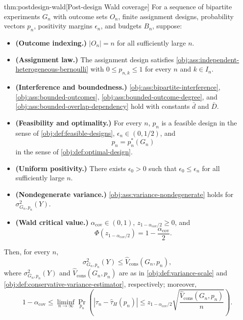 \begin{theoremv}{thm:postdesign-wald}[Post-design Wald coverage]
For a sequence of bipartite experiments $G_n$ with outcome sets $O_n$, finite assignment designs, probability vectors $p_n$, positivity margins $\epsilon_n$, and budgets $B_n$, suppose:
\begin{itemize}
\item \textbf{(Outcome indexing.)} $|O_n|=n$ for all sufficiently large $n$.
\item \textbf{(Assignment law.)} The assignment design satisfies \cref{obj:ass:independent-heterogeneous-bernoulli} with $0\le p_{n,k}\le 1$ for every $n$ and $k\in I_n$.
\item \textbf{(Interference and boundedness.)} \cref{obj:ass:bipartite-interference}, \cref{obj:ass:bounded-outcomes}, \cref{obj:ass:bounded-outcome-degree}, and \cref{obj:ass:bounded-overlap-dependency} hold with constants $\bar d$ and $\bar D$.
\item \textbf{(Feasibility and optimality.)} For every $n$, $p_n$ is a feasible design in the sense of \cref{obj:def:feasible-designs}, $\epsilon_n\in(0,1/2)$, and
\[
p_n=p_n^*(G_n)
\]
in the sense of \cref{obj:def:optimal-design}.
\item \textbf{(Uniform positivity.)} There exists $\epsilon_0>0$ such that $\epsilon_0\le\epsilon_n$ for all sufficiently large $n$.
\item \textbf{(Nondegenerate variance.)} \cref{obj:ass:variance-nondegenerate} holds for $\sigma^2_{G_n,p_n}(Y)$.
\item \textbf{(Wald critical value.)} $\alpha_{\mathrm{cov}}\in(0,1)$, $z_{1-\alpha_{\mathrm{cov}}/2}\ge0$, and
\[
\Phi\!\left(z_{1-\alpha_{\mathrm{cov}}/2}\right)
=1-\frac{\alpha_{\mathrm{cov}}}{2}.
\]
\end{itemize}
Then, for every $n$,
\[
\sigma^2_{G_n,p_n}(Y)\le \widehat V_{\mathrm{cons}}(G_n,p_n),
\]
where $\sigma^2_{G_n,p_n}(Y)$ and $\widehat V_{\mathrm{cons}}(G_n,p_n)$ are as in \cref{obj:def:variance-scale} and \cref{obj:def:conservative-variance-estimator}, respectively; moreover,
\[
1-\alpha_{\mathrm{cov}}
\le
\liminf_{n\to\infty}
\Pr_{p_n}\!\left(
\left|\tau_n-\widehat\tau_H(p_n)\right|
\le
z_{1-\alpha_{\mathrm{cov}}/2}
\sqrt{\frac{\widehat V_{\mathrm{cons}}(G_n,p_n)}{n}}
\right).
\]
\end{theoremv}

